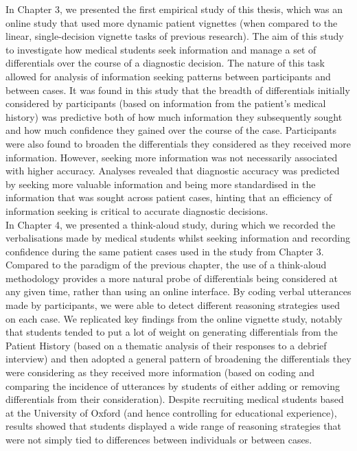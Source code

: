 \documentclass[a4paper, nobind]{templates/ociamthesis}
\begin{document}
In Chapter 3, we presented the first empirical study of this thesis, which was an online study that used more dynamic patient vignettes (when compared to the linear, single-decision vignette tasks of previous research). The aim of this study to investigate how medical students seek information and manage a set of differentials over the course of a diagnostic decision. The nature of this task allowed for analysis of information seeking patterns between participants and between cases. It was found in this study that the breadth of differentials initially considered by participants (based on information from the patient's medical history) was predictive both of how much information they subsequently sought and how much confidence they gained over the course of the case. Participants were also found to broaden the differentials they considered as they received more information. However, seeking more information was not necessarily associated with higher accuracy. Analyses revealed that diagnostic accuracy was predicted by seeking more valuable information and being more standardised in the information that was sought across patient cases, hinting that an efficiency of information seeking is critical to accurate diagnostic decisions.\\

In Chapter 4, we presented a think-aloud study, during which we recorded the verbalisations made by medical students whilst seeking information and recording confidence during the same patient cases used in the study from Chapter 3. Compared to the paradigm of the previous chapter, the use of a think-aloud methodology provides a more natural probe of differentials being considered at any given time, rather than using an online interface. By coding verbal utterances made by participants, we were able to detect different reasoning strategies used on each case. We replicated key findings from the online vignette study, notably that students tended to put a lot of weight on generating differentials from the Patient History (based on a thematic analysis of their responses to a debrief interview) and then adopted a general pattern of broadening the differentials they were considering as they received more information (based on coding and comparing the incidence of utterances by students of either adding or removing differentials from their consideration). Despite recruiting medical students based at the University of Oxford (and hence controlling for educational experience), results showed that students displayed a wide range of reasoning strategies that were not simply tied to differences between individuals or between cases.\\
\end{document}
